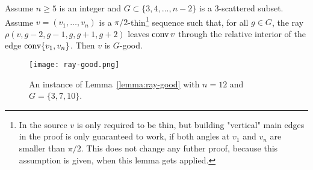 \begin{lemma}\label{lemma:ray-good}
  Assume $n\geq 5$ is an integer and $G\subset\{3,4,\dots,n-2\}$ is a $3$-scattered subset. Assume $v=(v_1,\dots,v_n)$ is a $\pi/2$-thin\footnote{In the source $v$ is only required to be thin, but building "vertical" main edges in the proof is only guaranteed to work, if both angles at $v_1$ and $v_n$ are smaller than $\pi/2$. This does not change any futher proof, because this assumption is given, when this lemma gets applied.} sequence such that, for all $g\in G$, the ray $\rho(v, g-2,g-1,g,g+1,g+2)$ leaves $\operatorname{conv} v$ through the relative interior of the edge $\operatorname{conv}\{v_1, v_n\}$. Then $v$ is $G$-good.
\end{lemma}

\begin{figure}[h]
  \centering
  \texttt{[image: ray-good.png]}
  \caption{An instance of Lemma~\ref{lemma:ray-good} with $n=12$ and $G=\{3,7,10\}$. \cite[Figure 7]{shitov2020sublinear}}
  \label{fig:ray-good}
\end{figure}

